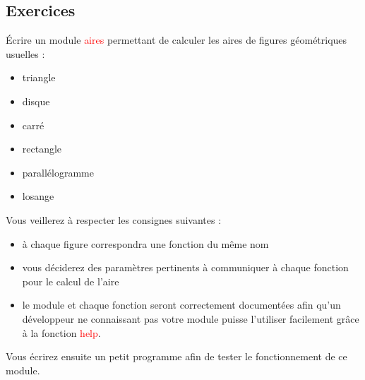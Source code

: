 \documentclass[12pt,fleqn]{book} %
\begin{document}
\subsection{Exercices}

Écrire un module \textcolor{red}{aires} permettant de calculer les aires de figures géométriques usuelles :\begin{itemize}
	\item triangle
	\item disque
	\item carré
	\item rectangle
	\item parallélogramme
	\item losange
\end{itemize}

Vous veillerez à respecter les consignes suivantes :
\begin{itemize}
	\item à chaque figure correspondra une fonction du même nom
	\item vous déciderez des paramètres pertinents à communiquer à chaque fonction pour le calcul de l'aire
	\item le module et chaque fonction seront correctement documentées afin qu'un développeur ne connaissant pas votre module puisse l'utiliser facilement grâce à la fonction \textcolor{red}{help}.
\end{itemize}

Vous écrirez ensuite un petit programme afin de tester le fonctionnement de ce module.
\end{document}
